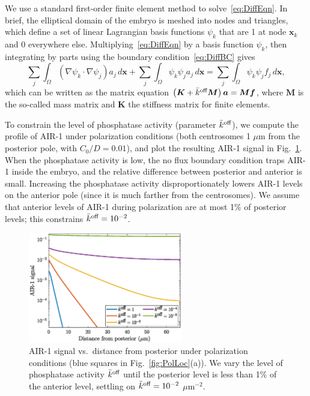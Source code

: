 \documentclass[11pt]{article}
\newcommand{\V}[1]{\boldsymbol{#1}}                 %
\newcommand{\M}[1]{\boldsymbol{#1}}
\begin{document}
\begin{appendix}
We use a standard first-order finite element method to solve\ \eqref{eq:DiffEqn}. In brief, the elliptical domain of the embryo is meshed into nodes and triangles, which define a set of linear Lagrangian basis functions $\psi_k$ that are 1 at node $\V{x}_k$ and 0 everywhere else. Multiplying\ \eqref{eq:DiffEqn} by a basis function $\psi_k$, then integrating by parts using the boundary condition\ \eqref{eq:DiffBC} gives 
\begin{equation}
\sum_j \int_{\Omega} \left(\nabla \psi_k \cdot \nabla \psi_j\right) a_j \, d\V{x}+\sum_j \int_{\Omega} \psi_k \psi_j a_j \, d\V{x}= \sum_j \int_{\Omega} \psi_k \psi_j f_j \, d\V{x},
\end{equation}
which can be written as the matrix equation $\left(\M K + \koffb \M M \right) \V a = \M M \V f$, where $\M{M}$ is the so-called mass matrix and $\M{K}$ the stiffness matrix for finite elements. 

To constrain the level of phosphatase activity (parameter $\bar{k}^\text{off}$), we compute the profile of AIR-1 under polarization conditions (both centrosomes 1 $\mu$m from the posterior pole, with $C_0/D=0.01$), and plot the resulting AIR-1 signal in Fig.\ \ref{fig:AIR1ProfKoff}. When the phosphatase activity is low, the no flux boundary condition traps AIR-1 inside the embryo, and the relative difference between posterior and anterior is small. Increasing the phosphatase activity disproportionately lowers AIR-1 levels on the anterior pole (since it is much farther from the centrosomes). We assume that anterior levels of AIR-1 during polarization are at most 1\% of posterior levels; this constrains $\bar{k}^\text{off}=10^{-2}$. 

\begin{figure}
\centering
\includegraphics[width=0.6\textwidth]{Glotzer/PolarizationKoffAir.eps}
\caption{\label{fig:AIR1ProfKoff}AIR-1 signal vs.\ distance from posterior under polarization conditions (blue squares in Fig.\ \ref{fig:PolLoc}(a)). We vary the level of phosphatase activity $\bar{k}^\text{off}$ until the posterior level is less than 1\% of the anterior level, settling on $\bar{k}^\text{off}=10^{-2}$ $\mu$m$^{-2}$.}
\end{figure}


\end{appendix}
\end{document}
